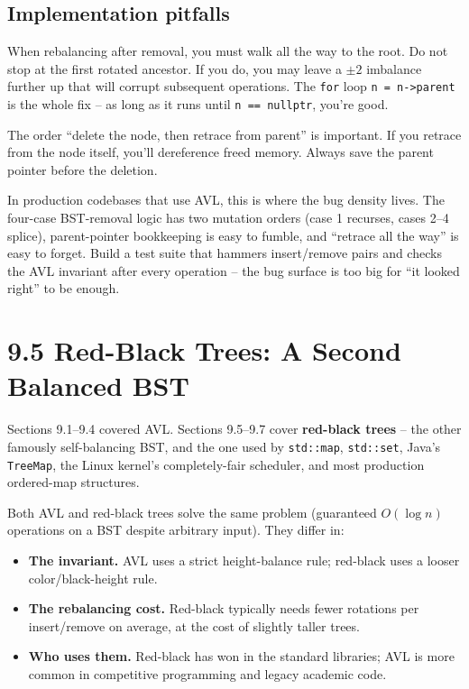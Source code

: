 \documentclass[11pt]{article}
\begin{document}
\subsection*{Implementation pitfalls}

\begin{warnbox}
When rebalancing after removal, you must walk all the way to the root. Do not stop at the first rotated ancestor. If you do, you may leave a $\pm 2$ imbalance further up that will corrupt subsequent operations. The \texttt{for} loop \texttt{n = n->parent} is the whole fix -- as long as it runs until \texttt{n == nullptr}, you're good.
\end{warnbox}

\begin{warnbox}
The order ``delete the node, then retrace from parent'' is important. If you retrace from the node itself, you'll dereference freed memory. Always save the parent pointer before the deletion.
\end{warnbox}

\begin{notebox}
In production codebases that use AVL, this is where the bug density lives. The four-case BST-removal logic has two mutation orders (case 1 recurses, cases 2--4 splice), parent-pointer bookkeeping is easy to fumble, and ``retrace all the way'' is easy to forget. Build a test suite that hammers insert/remove pairs and checks the AVL invariant after every operation -- the bug surface is too big for ``it looked right'' to be enough.
\end{notebox}

\section{9.5 Red-Black Trees: A Second Balanced BST}

Sections 9.1--9.4 covered AVL. Sections 9.5--9.7 cover \textbf{red-black trees} -- the other famously self-balancing BST, and the one used by \texttt{std::map}, \texttt{std::set}, Java's \texttt{TreeMap}, the Linux kernel's completely-fair scheduler, and most production ordered-map structures.

Both AVL and red-black trees solve the same problem (guaranteed $O(\log n)$ operations on a BST despite arbitrary input). They differ in:
\begin{itemize}[leftmargin=*]
    \item \textbf{The invariant.} AVL uses a strict height-balance rule; red-black uses a looser color/black-height rule.
    \item \textbf{The rebalancing cost.} Red-black typically needs fewer rotations per insert/remove on average, at the cost of slightly taller trees.
    \item \textbf{Who uses them.} Red-black has won in the standard libraries; AVL is more common in competitive programming and legacy academic code.
\end{itemize}
\end{document}
